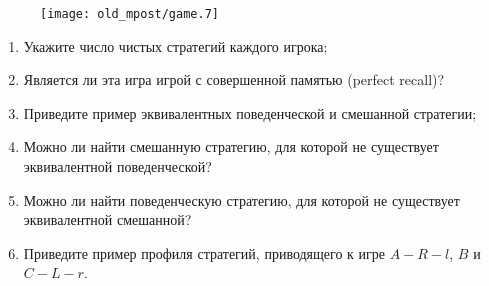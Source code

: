 \begin{problem}
\begin{figure}[ht]
     \texttt{[image: old\_mpost/game.7]}
\end{figure}

\begin{enumerate}
\item Укажите число чистых стратегий каждого игрока;\par
\item Является ли эта игра игрой с совершенной памятью (perfect recall)?\par
\item  Приведите пример эквивалентных поведенческой и смешанной стратегии; \par
\item Можно ли найти смешанную стратегию, для которой не существует эквивалентной поведенческой? \par
\item Можно ли найти поведенческую стратегию, для которой не существует эквивалентной смешанной? \par
\item Приведите пример профиля стратегий, приводящего к игре  $A-R-l$,  $B$  и  $C-L-r$.
\end{enumerate}


\begin{sol}

\end{sol}
\end{problem}




